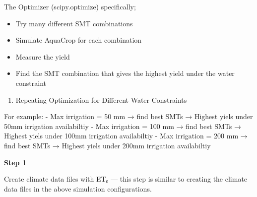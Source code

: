 \documentclass[
  letterpaper,
  DIV=11,
  numbers=noendperiod]{scrartcl}
\providecommand{\tightlist}{%
  \setlength{\itemsep}{0pt}\setlength{\parskip}{0pt}}\usepackage{longtable,booktabs,array}
\begin{document}
The Optimizer (scipy.optimize) specifically;

\begin{itemize}
\tightlist
\item
  Try many different SMT combinations
\item
  Simulate AquaCrop for each combination
\item
  Measure the yield
\item
  Find the SMT combination that gives the highest yield under the water
  constraint
\end{itemize}

\begin{enumerate}
\def\labelenumi{\arabic{enumi}.}
\setcounter{enumi}{4}
\tightlist
\item
  Repeating Optimization for Different Water Constraints
\end{enumerate}

For example: - Max irrigation = 50 mm → find best SMTs → Highest yiels
under 50mm irrigation availabiltiy - Max irrigation = 100 mm → find best
SMTs → Highest yiels under 100mm irrigation availabiltiy - Max
irrigation = 200 mm → find best SMTs → Highest yiels under 200mm
irrigation availabiltiy

\textbf{Step 1}

Create climate data files with ET₀ --- this step is similar to creating
the climate data files in the above simulation configurations.
\end{document}
